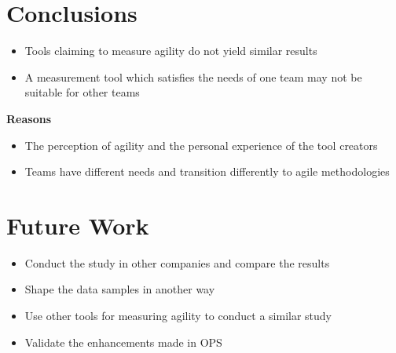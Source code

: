 \section{Conclusions}

\begin{itemize}
	\item Tools claiming to measure agility do not yield similar results
	\item A measurement tool which satisfies the needs of one team may not be suitable for other teams  
\end{itemize}

\textbf{Reasons}
\begin{itemize}
	\item The perception of agility and the personal experience of the tool creators
	\item Teams have different needs and transition differently to agile methodologies
\end{itemize}

\clearpage

\section{Future Work}

\begin{itemize}
	\item Conduct the study in other companies and compare the results
	\item Shape the data samples in another way
	\item Use other tools for measuring agility to conduct a similar study
	\item Validate the enhancements made in OPS
\end{itemize}

\clearpage
